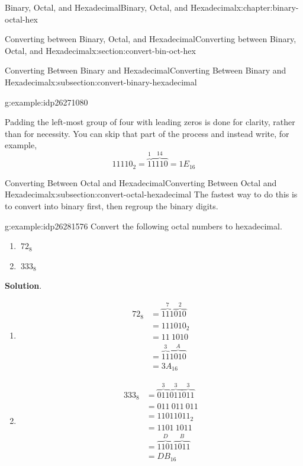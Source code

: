 \documentclass[twoside,10pt,]{book}
\newcommand{\blocktitlefont}{\relax}
\numberwithin{equation}{section}
\newcommand{\amp}{&}
\begin{document}
\begin{chapterptx}{Binary, Octal, and Hexadecimal}{}{Binary, Octal, and Hexadecimal}{}{}{x:chapter:binary-octal-hex}
\begin{sectionptx}{Converting between Binary, Octal, and Hexadecimal}{}{Converting between Binary, Octal, and Hexadecimal}{}{}{x:section:convert-bin-oct-hex}
\begin{subsectionptx}{Converting Between Binary and Hexadecimal}{}{Converting Between Binary and Hexadecimal}{}{}{x:subsection:convert-binary-hexadecimal}
\begin{example}{}{g:example:idp26271080}
\begin{enumerate}
\end{enumerate}
Padding the left-most group of four with leading zeros is done for clarity, rather than for necessity.  You can skip that part of the process and instead write, for example,%
\begin{equation*}
11110_2=\overbrace{1}^1\overbrace{1110}^{14}=1E_{16}
\end{equation*}
%
\end{example}
\end{subsectionptx}
%
%
\typeout{************************************************}
\typeout{************************************************}
%
\begin{subsectionptx}{Converting Between Octal and Hexadecimal}{}{Converting Between Octal and Hexadecimal}{}{}{x:subsection:convert-octal-hexadecimal}
The fastest way to do this is to convert into binary first, then regroup the binary digits.%
\begin{example}{}{g:example:idp26281576}%
Convert the following octal numbers to hexadecimal. %
\begin{enumerate}
\item{}\(\displaystyle \ 72_8\)%
\item{}\(\displaystyle \ 333_8\)%
\end{enumerate}
\par\smallskip%
\noindent\textbf{\blocktitlefont Solution}.\label{g:solution:idp26280936}{}\hypertarget{g:solution:idp26280936}{}\quad{}%
\begin{enumerate}
\item{}%
\begin{align*}
72_8 \amp = \overbrace{111}^7\overbrace{010}^2\\
\amp = 111010_2\\
\amp = 11\ 1010\\
\amp = \overbrace{11}^3\overbrace{1010}^{A}\\
\amp = 3A_{16}
\end{align*}
%
\item{}%
\begin{align*}
333_8 \amp =\overbrace{011}^3\overbrace{011}^3\overbrace{011}^3\\
\amp = 011\ 011\ 011\\
\amp = 11011011_2\\
\amp = 1101\ 1011\\
\amp = \overbrace{1101}^{D}\overbrace{1011}^{B}\\
\amp = DB_{16}
\end{align*}

\end{enumerate}
\end{example}
\end{subsectionptx}
\end{sectionptx}
\end{chapterptx}
\end{document}
